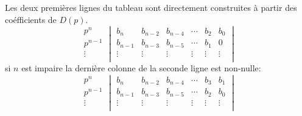 Les deux premières lignes du tableau sont directement construites à partir des coéfficients de $D(p)$.
\[
\begin{matrix}
    p^n    \\
    p^{n-1}\\
    \hline
    \vdots \\
\end{matrix}
\begin{vmatrix}
    b_n       & b_{n-2}    & b_{n-4}    & \cdots & b_2            & b_0         \\
    b_{n-1}   & b_{n-3}    & b_{n-5}    & \cdots & b_1            & 0           \\
    \hline
    \vdots    & \vdots     & \vdots     & \vdots & \vdots         & \vdots      \\
    \end{vmatrix}
\]
si $n$ est impaire la dernière colonne de la seconde ligne est non-nulle:
\[
\begin{matrix}
    p^n    \\
    p^{n-1}\\
    \hline
    \vdots \\
\end{matrix}
\begin{vmatrix}
    b_n       & b_{n-2}    & b_{n-4}    & \cdots & b_3            & b_1         \\
    b_{n-1}   & b_{n-3}    & b_{n-5}    & \cdots & b_2            & b_0         \\
    \hline
    \vdots    & \vdots     & \vdots     & \vdots & \vdots         & \vdots      \\
    \end{vmatrix}
\]

